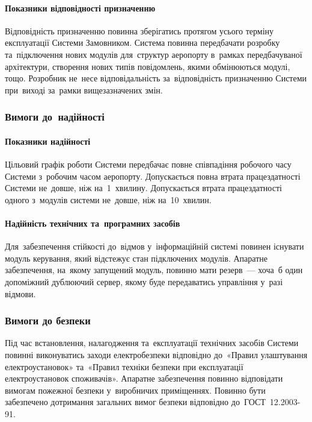 \documentclass[
	a4paper,
	oneside,
	BCOR = 10mm,
	DIV = 12,
	12pt,
	headings = normal,
]{scrartcl}
\begin{document}
				\paragraph{Показники відповідності призначенню}
					Відповідність призначенню повинна зберігатись протягом усього терміну експлуатації Системи Замовником. Система повинна передбачати розробку та~підключення нових модулів для~структур аеропорту в~рамках передбачуваної архітектури, створення нових типів повідомлень, якими обмінюються модулі, тощо. Розробник не~несе відповідальність за~відповідність призначенню Системи при~виході за~рамки вищезазначених змін.
				
			\subsubsection{Вимоги до~надійності}
				\paragraph{Показники надійності}
					Цільовий графік роботи Системи передбачає повне співпадіння робочого часу Системи з~робочим часом аеропорту. Допускається повна втрата працездатності Системи не~довше, ніж на~1~хвилину. Допускається втрата працездатності одного з~модулів системи не~довше, ніж на~10~хвилин.

				\paragraph{Надійність технічних та~програмних засобів}
					Для~забезпечення стійкості до~відмов у~інформаційній системі повинен існувати модуль керування, який відстежує стан підключених модулів. Апаратне забезпечення, на~якому запущений модуль, повинно мати резерв~— хоча~б один допоміжний дублюючий сервер, якому буде передаватись управління у~разі відмови.

			\subsubsection{Вимоги до безпеки}
				Під час встановлення, налагодження та~експлуатації технічних засобів Системи повинні виконуватись заходи електробезпеки відповідно до~«Правил улаштування електроустановок» та~«Правил техніки безпеки при експлуатації електроустановок споживачів». Апаратне забезпечення повинно відповідати вимогам пожежної безпеки у~виробничих приміщеннях. Повинно бути забезпечено дотримання загальних вимог безпеки відповідно до~ГОСТ~12.2003-91.
\end{document}
